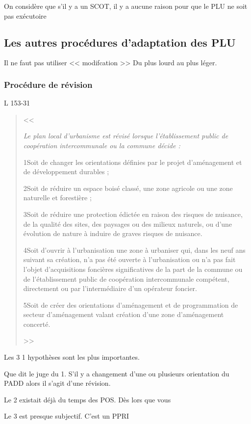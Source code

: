 		On considère que s'il y a un SCOT, il y a aucune raison pour que le PLU ne soit pas exécutoire


	\subsection{Les autres procédures d'adaptation des PLU}

		Il ne faut pas utiliser << modifcation >>
		 Du plus lourd au plus léger.

		 \subsubsection{Procédure de révision} L 153-31

		 \begin{quote}
		 	<< { \itshape
		 		Le plan local d'urbanisme est révisé lorsque l'établissement public de coopération intercommunale ou la commune décide :

		 		1\degres Soit de changer les orientations définies par le projet d'aménagement et de développement durables ;

		 		2\degres Soit de réduire un espace boisé classé, une zone agricole ou une zone naturelle et forestière ;

		 		3\degres Soit de réduire une protection édictée en raison des risques de nuisance, de la qualité des sites, des paysages ou des milieux naturels, ou d'une évolution de nature à induire de graves risques de nuisance.

		 		4\degres Soit d'ouvrir à l'urbanisation une zone à urbaniser qui, dans les neuf ans suivant sa création, n'a pas été ouverte à l'urbanisation ou n'a pas fait l'objet d'acquisitions foncières significatives de la part de la commune ou de l'établissement public de coopération intercommunale compétent, directement ou par l'intermédiaire d'un opérateur foncier.

		 		5\degres Soit de créer des orientations d'aménagement et de programmation de secteur d'aménagement valant création d'une zone d'aménagement concerté.
		 	} >>
		 \end{quote}

	 	Les 3 1\ieres{} hypothèses sont les plus importantes.

	 	Que dit le juge du 1. S'il y a changement d'une ou plusieurs orientation du PADD alors il s'agit d'une révision.

	 	Le 2 existait déjà du temps des POS. Dès lors que vous

	 	Le 3 est presque subjectif. C'est un PPRI

